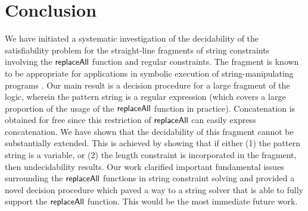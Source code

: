 
\section{Conclusion}

We have initiated a systematic investigation of the decidability of 
the satisfiability problem for the straight-line fragments of string 
constraints involving the $\mathsf{replaceAll}$ function and regular constraints.
The fragment is known to be appropriate for applications in symbolic execution 
of 
string-manipulating programs \cite{LB16}. Our main result is a decision 
procedure for a large fragment of the logic, wherein the pattern string is
a regular expression (which covers a large proportion of the usage of the 
$\mathsf{replaceAll}$ function in practice). Concatenation is obtained for free since 
this restriction of $\mathsf{replaceAll}$ can easily express concatenation.
We have shown that the decidability
of this fragment cannot be substantially extended. This is achieved by showing
that if either (1) the pattern string is a variable, or (2) the length
constraint is incorporated in the fragment, then undecidability results.
Our work clarified important fundamental issues surrounding the $\mathsf{replaceAll}$
functions in string constraint solving and provided a novel decision procedure
which paved a way to a string solver that is able to fully support the
$\mathsf{replaceAll}$ function. This would be the most immediate future work. 
